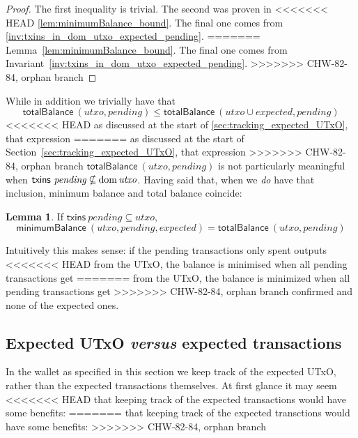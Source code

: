 \documentclass{article}
\DeclareMathOperator{\dom}{dom}
\theoremstyle{definition}{
  \newtheorem{lemma}{Lemma}[section] %
  \newtheorem{definition}[lemma]{Definition}
}
\theoremstyle{theorem}{
  \newtheorem{invariant}[lemma]{Invariant}
  \newtheorem{proofobligation}[lemma]{Proof Obligation}
}
\newtheorem{lemma}{Lemma}[section] %
\numberwithin{equation}{lemma}
\begin{document}
\begin{proof}
The first inequality is trivial. The second was proven in
<<<<<<< HEAD
\cref{lem:minimumBalance_bound}. The final one comes from
\cref{inv:txins_in_dom_utxo_expected_pending}.
=======
Lemma~\ref{lem:minimumBalance_bound}. The final one comes from
Invariant~\ref{inv:txins_in_dom_utxo_expected_pending}.
>>>>>>> CHW-82-84, orphan branch
\end{proof}

While in addition we trivially have that
%
\begin{equation*}
    \mathsf{totalBalance} ~ (\mathit{utxo}, \mathit{pending})
\le \mathsf{totalBalance} ~ (\mathit{utxo} \cup \mathit{expected}, \mathit{pending})
\end{equation*}
%
<<<<<<< HEAD
as discussed at the start of \cref{sec:tracking_expected_UTxO}, that expression
=======
as discussed at the start of Section~\ref{sec:tracking_expected_UTxO}, that expression
>>>>>>> CHW-82-84, orphan branch
\begin{math}
\mathsf{totalBalance} ~ (\mathit{utxo}, \mathit{pending})
\end{math}
is not particularly meaningful when
\begin{math}
\mathsf{txins} ~ \mathit{pending} \mathbin{\slashed\subseteq} \dom \mathit{utxo}
\end{math}. Having said that, when we \emph{do} have that inclusion, minimum
balance and total balance coincide:
%
\begin{lemma}
If $\mathsf{txins} ~ \mathit{pending} \subseteq \mathit{utxo}$,
\begin{equation*}
  \mathsf{minimumBalance} ~ (\mathit{utxo}, \mathit{pending}, \mathit{expected})
= \mathsf{totalBalance} ~ (\mathit{utxo}, \mathit{pending})
\end{equation*}
\label{lem:minimumBalance_equal_totalBalance}
\end{lemma}
%
Intuitively this makes sense: if the pending transactions only spent outputs
<<<<<<< HEAD
from the UTxO, the balance is minimised when all pending transactions get
=======
from the UTxO, the balance is minimized when all pending transactions get
>>>>>>> CHW-82-84, orphan branch
confirmed and none of the expected ones.

\subsection{Expected UTxO \emph{versus} expected transactions}

In the wallet as specified in this section we keep track of the expected UTxO,
rather than the expected transactions themselves. At first glance it may seem
<<<<<<< HEAD
that keeping track of the expected transactions would have some benefits:
=======
that keeping track of the expected transctions would have some benefits:
>>>>>>> CHW-82-84, orphan branch
\end{document}

